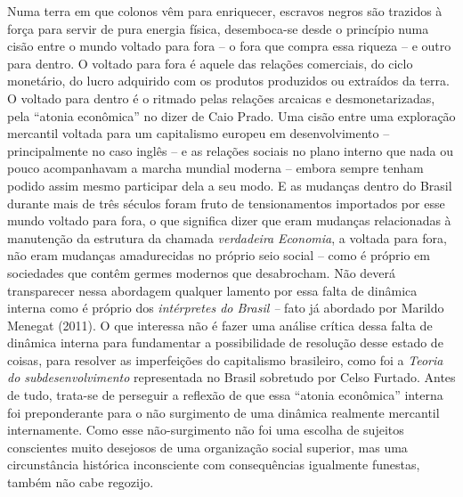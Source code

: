 Numa terra em que colonos vêm para enriquecer, escravos negros são
trazidos à força para servir de pura energia física, desemboca-se desde
o princípio numa cisão entre o mundo voltado para fora -- o fora que
compra essa riqueza -- e outro para dentro. O voltado para fora é aquele
das relações comerciais, do ciclo monetário, do lucro adquirido com os
produtos produzidos ou extraídos da terra. O voltado para dentro é o
ritmado pelas relações arcaicas e desmonetarizadas, pela ``atonia
econômica'' no dizer de Caio Prado. Uma cisão entre uma exploração
mercantil voltada para um capitalismo europeu em desenvolvimento --
principalmente no caso inglês -- e as relações sociais no plano interno
que nada ou pouco acompanhavam a marcha mundial moderna -- embora sempre
tenham podido assim mesmo participar dela a seu modo. E as mudanças
dentro do Brasil durante mais de três séculos foram fruto de
tensionamentos importados por esse mundo voltado para fora, o que
significa dizer que eram mudanças relacionadas à manutenção da estrutura
da chamada \emph{verdadeira} \emph{Economia}, a voltada para fora, não
eram mudanças amadurecidas no próprio seio social -- como é próprio em
sociedades que contêm germes modernos que desabrocham. Não deverá
transparecer nessa abordagem qualquer lamento por essa falta de dinâmica
interna como é próprio dos \emph{intérpretes do Brasil --} fato já
abordado por Marildo Menegat (2011). O que interessa não é fazer uma
análise crítica dessa falta de dinâmica interna para fundamentar a
possibilidade de resolução desse estado de coisas, para resolver as
imperfeições do capitalismo brasileiro, como foi a \emph{Teoria do
subdesenvolvimento} representada no Brasil sobretudo por Celso Furtado.
Antes de tudo, trata-se de perseguir a reflexão de que essa ``atonia
econômica'' interna foi preponderante para o não surgimento de uma
dinâmica realmente mercantil internamente. Como esse não-surgimento não
foi uma escolha de sujeitos conscientes muito desejosos de uma
organização social superior, mas uma circunstância histórica
inconsciente com consequências igualmente funestas, também não cabe
regozijo.

